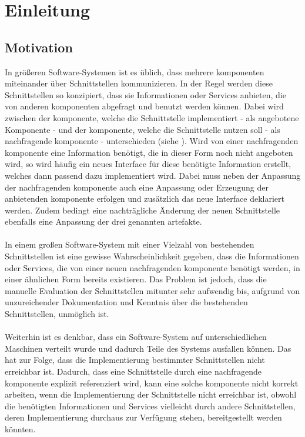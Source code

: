\chapter{Einleitung}
\section{Motivation}
In größeren Software-Systemen ist es üblich, dass mehrere \gls{komponente}n miteinander über Schnittstellen kommunizieren. In der Regel werden diese Schnittstellen so konzipiert, dass sie Informationen oder Services anbieten, die von anderen \gls{komponente}n abgefragt und benutzt werden können. Dabei wird zwischen der \gls{komponente}, welche die Schnittstelle implementiert - als angebotene Komponente - und der \gls{komponente}, welche die Schnittstelle nutzen soll - als nachfragende \gls{komponente} - unterschieden (siehe ). 
\noindent
Wird von einer nachfragenden \gls{komponente} eine Information benötigt, die in dieser Form noch nicht angeboten wird, so wird häufig ein neues Interface für diese benötigte Information erstellt, welches dann passend dazu implementiert wird. Dabei muss neben der Anpassung der nachfragenden \gls{komponente} auch eine Anpassung oder Erzeugung der anbietenden \gls{komponente} erfolgen und zusätzlich das neue Interface deklariert werden. Zudem bedingt eine nachträgliche Änderung der neuen Schnittstelle ebenfalls eine Anpassung der drei genannten \gls{artefakt}e.\\\\
In einem großen Software-System mit einer Vielzahl von bestehenden Schnittstellen ist eine gewisse Wahrscheinlichkeit gegeben, dass die Informationen oder Services, die von einer neuen nachfragenden \gls{komponente} benötigt werden, in einer ähnlichen Form bereits existieren. Das Problem ist jedoch, dass die manuelle Evaluation der Schnittstellen mitunter sehr aufwendig bis, aufgrund von unzureichender Dokumentation und Kenntnis über die bestehenden Schnittstellen, unmöglich ist.
\\\\
Weiterhin ist es denkbar, dass ein Software-System auf unterschiedlichen Maschinen verteilt wurde und dadurch Teile des Systems ausfallen können. Das hat zur Folge, dass die Implementierung bestimmter Schnittstellen nicht erreichbar ist. Dadurch, dass eine Schnittstelle durch eine nachfragende \gls{komponente} explizit referenziert wird, kann eine solche \gls{komponente} nicht korrekt arbeiten, wenn die Implementierung der Schnittstelle nicht erreichbar ist, obwohl die benötigten Informationen und Services vielleicht durch andere Schnittstellen, deren Implementierung durchaus zur Verfügung stehen, bereitgestellt werden könnten.
